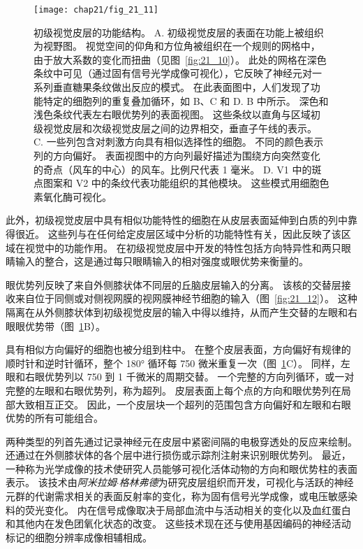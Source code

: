 \begin{figure}[htbp]
	\centering
	\texttt{[image: chap21/fig\_21\_11]}
	\caption{初级视觉皮层的功能结构。
		A. 初级视觉皮层的表面在功能上被组织为视野图。 
		视觉空间的仰角和方位角被组织在一个规则的网格中，由于放大系数的变化而扭曲（见图~\ref{fig:21_10}）。
		此处的网格在深色条纹中可见（通过固有信号光学成像可视化），它反映了神经元对一系列垂直糖果条纹做出反应的模式。
		在此表面图中，人们发现了功能特定的细胞列的重复叠加循环，如 B、C 和 D. B 中所示。
		深色和浅色条纹代表左右眼优势列的表面视图。
		这些条纹以直角与区域初级视觉皮层和次级视觉皮层之间的边界相交，垂直子午线的表示。
		C. 一些列包含对刺激方向具有相似选择性的细胞。 
		不同的颜色表示列的方向偏好。
		表面视图中的方向列最好描述为围绕方向突然变化的奇点（风车的中心）的风车。比例尺代表 1 毫米。
		D. V1 中的斑点图案和 V2 中的条纹代表功能组织的其他模块。
		这些模式用细胞色素氧化酶可视化。}
	\label{fig:21_11}
\end{figure}


此外，初级视觉皮层中具有相似功能特性的细胞在从皮层表面延伸到白质的列中靠得很近。
这些列与在任何给定皮层区域中分析的功能特性有关，因此反映了该区域在视觉中的功能作用。
在初级视觉皮层中开发的特性包括方向特异性和两只眼睛输入的整合，这是通过每只眼睛输入的相对强度或眼优势来衡量的。


眼优势列反映了来自外侧膝状体不同层的丘脑皮层输入的分离。
该核的交替层接收来自位于同侧或对侧视网膜的视网膜神经节细胞的输入（图~\ref{fig:21_12}）。
这种隔离在从外侧膝状体到初级视觉皮层的输入中得以维持，从而产生交替的左眼和右眼眼优势带（图~\ref{fig:21_11}B）。


具有相似方向偏好的细胞也被分组到柱中。
在整个皮层表面，方向偏好有规律的顺时针和逆时针循环，整个 180° 循环每 750 微米重复一次（图~\ref{fig:21_11}C）。
同样，左眼和右眼优势列以 750 到 1 千微米的周期交替。
一个完整的方向列循环，或一对完整的左眼和右眼优势列，称为超列。
皮层表面上每个点的方向和眼优势列在局部大致相互正交。
因此，一个皮层块一个超列的范围包含方向偏好和左眼和右眼优势的所有可能组合。


两种类型的列首先通过记录神经元在皮层中紧密间隔的电极穿透处的反应来绘制。
还通过在外侧膝状体的各个层中进行损伤或示踪剂注射来识别眼优势列。
最近，一种称为光学成像的技术使研究人员能够可视化活体动物的方向和眼优势柱的表面表示。 
该技术由\textit{阿米拉姆$\cdot$格林弗德}为研究皮层组织而开发，可视化与活跃的神经元群的代谢需求相关的表面反射率的变化，称为固有信号光学成像，或电压敏感染料的荧光变化。 
内在信号成像取决于局部血流中与活动相关的变化以及血红蛋白和其他内在发色团氧化状态的改变。 
这些技术现在还与使用基因编码的神经活动标记的细胞分辨率成像相辅相成。


